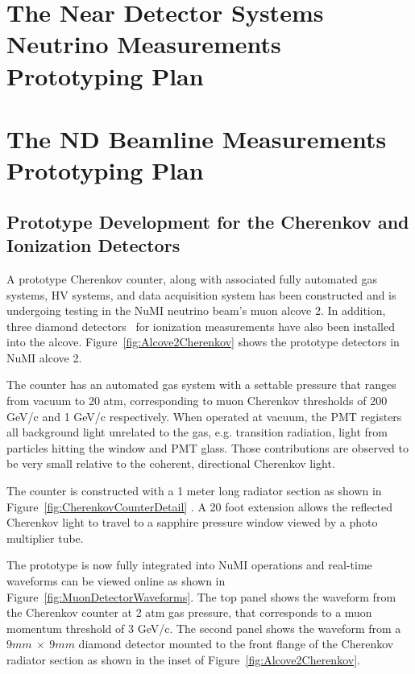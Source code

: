 
\section{The Near Detector Systems Neutrino Measurements Prototyping Plan} 
\label{sec:proto-nd-nnd}


\section{The ND Beamline Measurements Prototyping Plan} 
\label{sec:proto-nd-blm}

\subsection{Prototype Development for the Cherenkov and Ionization Detectors}
\label{subsec:proto-blm-muon-cherenkov-proto}

A prototype Cherenkov counter, along with associated fully automated gas systems,
HV systems, and data acquisition system has been constructed and is undergoing
testing in the NuMI neutrino beam's muon alcove 2. In addition, three diamond
detectors~\cite{ref:CERNdiamond} for ionization measurements have also been installed into the alcove.
Figure~\ref{fig:Alcove2Cherenkov} shows the prototype detectors in NuMI alcove 2.

The counter has an automated gas system with a settable pressure that ranges
from vacuum to 20 atm, corresponding to muon Cherenkov thresholds of 
200 GeV/c and 1 GeV/c respectively. When operated at vacuum, the PMT registers all background light
unrelated to the gas, e.g. transition radiation, light from particles hitting the window and PMT glass.
Those contributions are observed to be very small relative to the coherent, directional Cherenkov light.

The counter is constructed with a 1 meter long radiator section
as shown in Figure~\ref{fig:CherenkovCounterDetail} . A 20 foot extension allows the reflected 
Cherenkov light to travel to a sapphire pressure window viewed by a photo multiplier tube.

The prototype is now fully integrated into NuMI operations and real-time waveforms can be viewed online as shown in Figure~\ref{fig:MuonDetectorWaveforms}. The top panel shows the waveform from the Cherenkov counter at 2 atm gas pressure, that corresponds to a muon momentum threshold of 3 GeV/c. The second panel shows the waveform from a $9mm\ \times\ 9mm$ diamond detector mounted to the front flange of the Cherenkov radiator section as shown in the inset 
of Figure~\ref{fig:Alcove2Cherenkov}.

